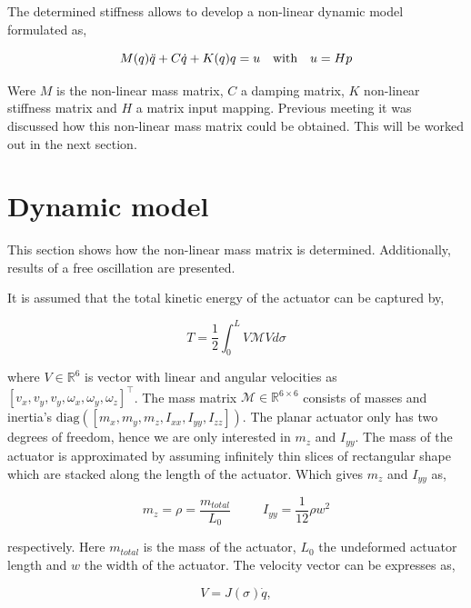 The determined stiffness allows to develop a non-linear dynamic model formulated as,

\begin{equation}
    M(q)\Ddot{q} + C\dot{q} + K(q)q = u \hspace{10pt} \text{with} \hspace{10pt} u = Hp
    \label{eq:p}
\end{equation}

Were $M$ is the non-linear mass matrix, $C$ a damping matrix, $K$ non-linear stiffness matrix and $H$ a matrix input mapping. Previous meeting it was discussed how this non-linear mass matrix could be obtained. This will be worked out in the next section.


\section{Dynamic model}

This section shows how the non-linear mass matrix is determined. Additionally, results of a free oscillation are presented. 

It is assumed that the total kinetic energy of the actuator can be captured by,

\begin{equation}
    T = \frac{1}{2} \int_0^L V \mathcal{M} V d\sigma
\end{equation}

where $V \in \mathbb{R}^6$ is vector with linear and angular velocities as $[v_x,v_y,v_y,\omega_{x},\omega_{y},\omega_{z}]^\top$. The mass matrix $\mathcal{M} \in \mathbb{R}^{6\times6}$ consists of masses and inertia's $\text{diag}([m_x,m_y,m_z,I_{xx},I_{yy},I_{zz}])$. The planar actuator only has two degrees of freedom, hence we are only interested in $m_z$ and $I_{yy}$. The mass of the actuator is approximated by assuming infinitely thin slices of rectangular shape which are stacked along the length of the actuator. Which gives $m_z$ and $I_{yy}$ as,

\begin{equation}
    m_z = \rho = \frac{m_{total}}{L_0} \hspace{30pt} I_{yy} = \frac{1}{12}\rho w^2
\end{equation}

respectively. Here $m_{total}$ is the mass of the actuator, $L_0$ the undeformed actuator length and $w$ the width of the actuator. The velocity vector can be expresses as,

\begin{equation}
    V = J(\sigma)\dot{q},
\end{equation}

